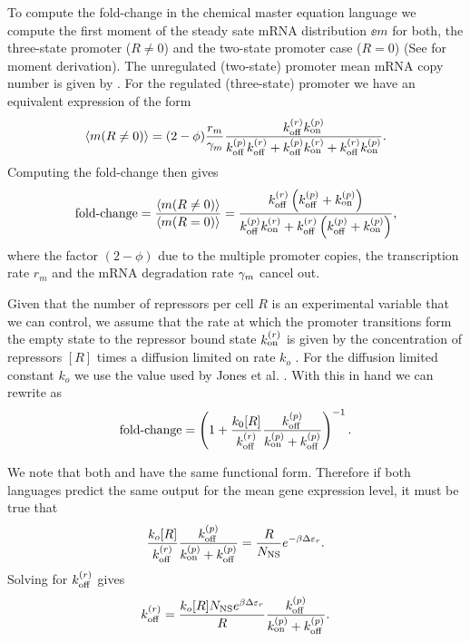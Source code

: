 To compute the fold-change in the chemical master equation language we compute
the first moment of the steady sate mRNA distribution $\ee{m}$ for both, the
three-state promoter ($R \neq 0$) and the two-state promoter case ($R=0$) (See
 for moment derivation). The unregulated (two-state)
promoter mean mRNA copy number is given by . For
the regulated (three-state) promoter we have an equivalent expression of the
form
\begin{equation}
  \left\langle m (R \neq 0) \right\rangle = (2 - \phi){r_m \over \gamma _m} {k^{(r)}_{\text{off}}k^{(p)}_{\text{on}}
  \over k^{(p)}_{\text{off}}k^{(r)}_{\text{off}} + k^{(p)}_{\text{off}}k^{(r)}_{\text{on}} + k^{(r)}_{\text{off}}k^{(p)}_{\text{on}}}.
\end{equation}
Computing the fold-change then gives
\begin{equation}
  \text{fold-change} = {\left\langle m (R \neq 0) \right\rangle \over \left\langle m (R = 0) \right\rangle} =
  {k^{(r)}_{\text{off}} \left( k^{(p)}_{\text{off}} + k^{(p)}_{\text{on}} \right) \over
  k^{(p)}_{\text{off}}k^{(r)}_{\text{on}} + k^{(r)}_{\text{off}} \left( k^{(p)}_{\text{off}} + k^{(p)}_{\text{on}} \right)},
  \label{seq_fold_change_cme}
\end{equation}
where the factor $(2 - \phi)$ due to the multiple promoter copies, the
transcription rate $r_m$ and the mRNA degradation rate $\gamma _m$ cancel out.

Given that the number of repressors per cell $R$ is an experimental variable
that we can control, we assume that the rate at which the promoter transitions
form the empty state to the repressor bound state $k^{(r)}_{\text{on}}$ is given by the
concentration of repressors $[R]$ times a diffusion limited on rate $k_o$
\cite{Jones2014a}.  For the diffusion limited constant $k_o$ we use the value
used by Jones et al. \cite{Jones2014a} . With this in hand we can rewrite
 as
\begin{equation}
  \text{fold-change} = \left( 1 + {k_0 [R] \over k^{(r)}_{\text{off}}}
                {k^{(p)}_{\text{off}} \over k^{(p)}_{\text{on}} + k^{(p)}_{\text{off}}} \right)^{-1}.
  \label{seq_fc_kinetic}
\end{equation}

We note that both  and  have the same
functional form. Therefore if both languages predict the same output for the
mean gene expression level, it must be true that
\begin{equation}
  {k_o [R] \over k^{(r)}_{\text{off}}}{k^{(p)}_{\text{off}}\over k^{(p)}_{\text{on}}+ k^{(p)}_{\text{off}}} =
  {R \over N_\text{NS}} e^{-\beta\Delta\varepsilon_r}.
\end{equation}
Solving for $k^{(r)}_{\text{off}}$ gives
\begin{equation}
  k^{(r)}_{\text{off}} = {k_o [R] N_\text{NS} e^{\beta\Delta\varepsilon_r} \over R}{k^{(p)}_{\text{off}} \over k^{(p)}_{\text{on}} + k^{(p)}_{\text{off}}}.
  \label{seq_kroff_complete}
\end{equation}

